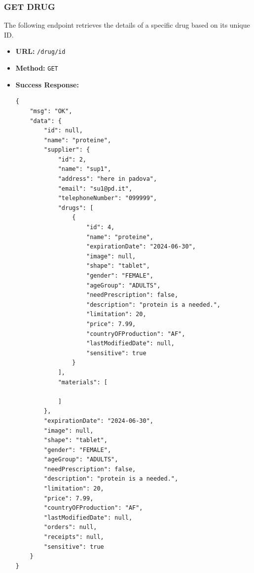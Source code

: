 \subsubsection*{GET DRUG}
The following endpoint retrieves the details of a specific drug based on its unique ID.
\begin{itemize}
    \item \textbf{URL:}
    \newline \hspace*{1cm} \texttt{/drug/id}  
    \item \textbf{Method:}
    \newline \hspace*{1cm}\texttt{GET}
    \item \textbf{Success Response:}
\begin{lstlisting}[breaklines]
{
    "msg": "OK",
    "data": {
        "id": null,
        "name": "proteine",
        "supplier": {
            "id": 2,
            "name": "sup1",
            "address": "here in padova",
            "email": "su1@pd.it",
            "telephoneNumber": "099999",
            "drugs": [
                {
                    "id": 4,
                    "name": "proteine",
                    "expirationDate": "2024-06-30",
                    "image": null,
                    "shape": "tablet",
                    "gender": "FEMALE",
                    "ageGroup": "ADULTS",
                    "needPrescription": false,
                    "description": "protein is a needed.",
                    "limitation": 20,
                    "price": 7.99,
                    "countryOFProduction": "AF",
                    "lastModifiedDate": null,
                    "sensitive": true
                }
            ],
            "materials": [
               
            ]
        },
        "expirationDate": "2024-06-30",
        "image": null,
        "shape": "tablet",
        "gender": "FEMALE",
        "ageGroup": "ADULTS",
        "needPrescription": false,
        "description": "protein is a needed.",
        "limitation": 20,
        "price": 7.99,
        "countryOFProduction": "AF",
        "lastModifiedDate": null,
        "orders": null,
        "receipts": null,
        "sensitive": true
    }
}
\end{lstlisting}
\end{itemize}

